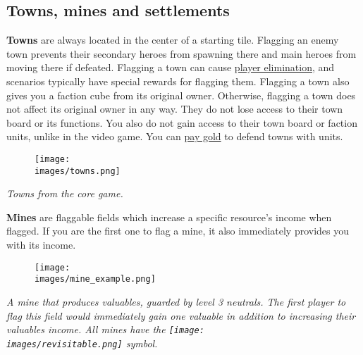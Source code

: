\documentclass[12pt]{article}
\def\assets{assets}
\def\images{\assets/images}
\begin{document}
\clearpage
\subsection*{Towns, mines and settlements}
\textbf{Towns} are always located in the center of a starting tile. Flagging an enemy town prevents their secondary heroes from spawning there and main heroes from moving there if defeated. Flagging a town can cause \hyperlink{End}{player elimination}, and scenarios typically have special rewards for flagging them. Flagging a town also gives you a faction cube from its original owner. Otherwise, flagging a town does not affect its original owner in any way. They do not lose access to their town board or its functions. You also do not gain access to their town board or faction units, unlike in the video game. You can \hyperlink{Town}{pay gold} to defend towns with units.\\
\begin{figure}[h]
\centering
\texttt{[image: \\images/towns.png]}
\end{figure}
\begin{center}
\textit{Towns from the core game.}
\end{center}
\textbf{Mines} are flaggable fields which increase a specific resource's income when flagged. If you are the first one to flag a mine, it also immediately provides you with its income.
\begin{figure}[h]
\centering
\texttt{[image: \\images/mine\_example.png]}
\end{figure}
\begin{center}
\textit{A mine that produces valuables, guarded by level 3 neutrals. The first player to flag this field would immediately gain one valuable in addition to increasing their valuables income. All mines have the \texttt{[image: \\images/revisitable.png]} symbol.}
\end{center}
\end{document}
